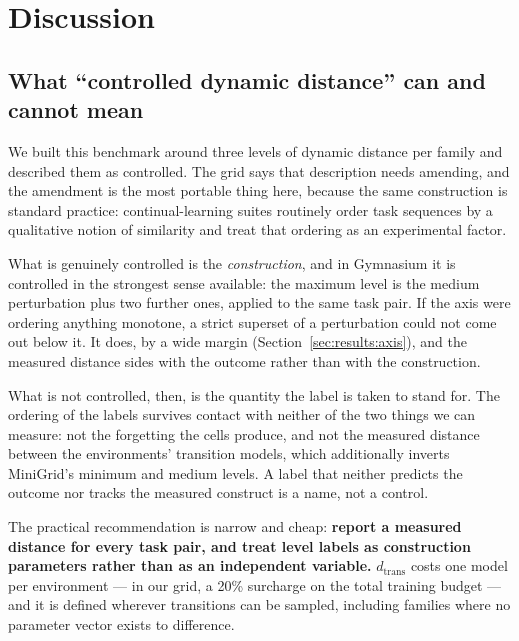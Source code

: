 
\section{Discussion}
\label{sec:discussion}

\subsection{What ``controlled dynamic distance'' can and cannot mean}
\label{sec:discussion:axis}

We built this benchmark around three levels of dynamic distance per family and
described them as controlled. The grid says that description needs amending, and
the amendment is the most portable thing here, because the same construction is
standard practice: continual-learning suites routinely order task sequences by a
qualitative notion of similarity and treat that ordering as an experimental
factor.

What is genuinely controlled is the \emph{construction}, and in Gymnasium it is
controlled in the strongest sense available: the maximum level is the medium
perturbation plus two further ones, applied to the same task pair. If the axis
were ordering anything monotone, a strict superset of a perturbation could not
come out below it. It does, by a wide margin
(Section~\ref{sec:results:axis}), and the measured distance sides with the
outcome rather than with the construction.

What is not controlled, then, is the quantity the label is taken to stand for.
The ordering of the labels survives contact with neither of the two things we
can measure: not the forgetting the cells produce, and not the measured distance
between the environments' transition models, which additionally inverts
MiniGrid's minimum and medium levels. A label that neither predicts the outcome
nor tracks the measured construct is a name, not a control.

The practical recommendation is narrow and cheap: \textbf{report a measured
distance for every task pair, and treat level labels as construction parameters
rather than as an independent variable.} $d_{\mathrm{trans}}$ costs one model per
environment --- in our grid, a 20\% surcharge on the total training budget --- and
it is defined wherever transitions can be sampled, including families where no
parameter vector exists to difference.

